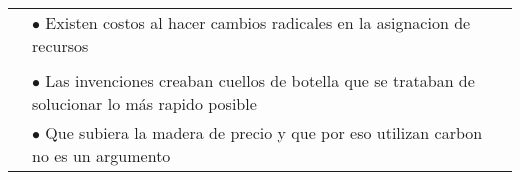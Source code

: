 \begin{tabular}{p{3cm}|p{11cm}}
                               & \hspace{1cm} $\bullet$ Existen costos al hacer cambios radicales en la asignacion de recursos                                                                                             \\                                                                                  \\
                               & $\bullet$ Las invenciones creaban cuellos de botella que se trataban de solucionar lo más rapido posible                                                                                  \\
                               & $\bullet$ Que subiera la madera de precio y que por eso utilizan carbon no es un argumento
\end{tabular}
\endgroup

